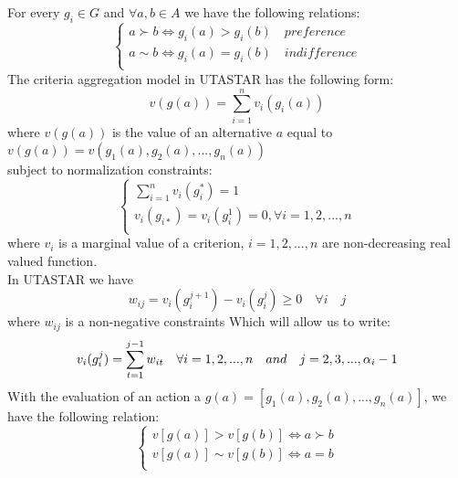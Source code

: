 \documentclass{report}
\begin{document}
For every $g_i \in G$ and $\forall a, b \in A$ we have the following relations: 
\begin{equation}
\begin{cases}
a \succ b\Leftrightarrow g_i(a) > g_i(b) \quad preference\\
a\sim b \Leftrightarrow g_i(a) = g_i(b) \quad indifference \\
\end{cases}
\end{equation}
The criteria aggregation model in UTASTAR has the following form:
\begin{equation}\label{eq1}
v(g(a)) = \sum_{i=1}^{n} v_i (g_i (a))
\end{equation}
where $v(g(a))$ is the value of an alternative $a$ equal to $v(g(a)) = v(g_1(a), g_2(a),..., g_n(a))$\\
subject to normalization constraints:\\
\begin{equation}\label{eq2}
\begin{cases}
\sum_{i=1}^{n} v_i(g_{i}^{*}) = 1\\
v_i(g_{i*})= v_i(g_i^1) = 0, \forall i = 1, 2, ..., n\\
\end{cases}
\end{equation}
where $ v_i $ is a marginal value of a criterion, $ i = 1,2,...,n$ are non-decreasing real valued function.\\
In UTASTAR we have 
\begin{equation}
w_{ij} = v_i(g_i^{j+1}) - v_i(g_i^{j}) \geq 0 \quad \forall i \quad j 
\end{equation}
where $w_{ij}$ is a non-negative constraints
Which will allow us to write: 
\begin{equation}
v_i(g_i^j) = \sum_{t=1}^{j-1} w_{it} \quad \forall i = 1,2,...,n \quad and \quad j = 2,3,...,\alpha _i -1 \\
\end{equation}
With the evaluation of an action a $g(a) = [g_1(a) , g_2(a) , ... , g_n(a)] $, we have the following relation:
\begin{equation}
\begin{cases}
v[g(a)] > v[g(b)] \Leftrightarrow a \succ b\\
v[g(a)] \sim v[g(b)] \Leftrightarrow a = b\\
\end{cases}
\end{equation}

\newpage
\end{document}
